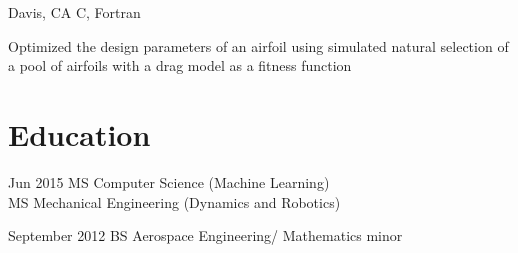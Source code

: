 \documentclass[letterpaper]{simjega-resume}
\begin{document}
{Davis, CA}
{} %
{C, Fortran}
{\begin{tightitemize}
\item[] Optimized the design parameters of an airfoil using simulated
natural selection of a pool of airfoils with a drag model as a fitness function
\end{tightitemize}}



\section{Education}
\jgsectionline

{Jun 2015}
{MS Computer Science (Machine Learning)\\
MS Mechanical Engineering (Dynamics and Robotics)}

{September 2012}
{BS Aerospace Engineering/ Mathematics minor}


\end{document}
